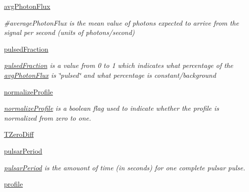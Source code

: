 \begin{DoxyCompactItemize}
\hyperlink{classmodest_1_1signals_1_1periodicxraysource_1_1PeriodicXRaySource_ab18463cedaf7e9ea17447e46f341bbb0}{avg\+Photon\+Flux}
\begin{DoxyCompactList}\small\item\em \#average\+Photon\+Flux is the mean value of photons expected to arrive from the signal per second (units of photons/second) \end{DoxyCompactList}\item 
\hyperlink{classmodest_1_1signals_1_1periodicxraysource_1_1PeriodicXRaySource_af76a5783d522dde15f37a9c48aa04391}{pulsed\+Fraction}
\begin{DoxyCompactList}\small\item\em \hyperlink{classmodest_1_1signals_1_1periodicxraysource_1_1PeriodicXRaySource_af76a5783d522dde15f37a9c48aa04391}{pulsed\+Fraction} is a value from 0 to 1 which indicates what percentage of the \hyperlink{classmodest_1_1signals_1_1periodicxraysource_1_1PeriodicXRaySource_ab18463cedaf7e9ea17447e46f341bbb0}{avg\+Photon\+Flux} is \char`\"{}pulsed\char`\"{} and what percentage is constant/background \end{DoxyCompactList}\item 
\hyperlink{classmodest_1_1signals_1_1periodicxraysource_1_1PeriodicXRaySource_a61df217b2685c2ccf9b0220044849a3c}{normalize\+Profile}
\begin{DoxyCompactList}\small\item\em \hyperlink{classmodest_1_1signals_1_1periodicxraysource_1_1PeriodicXRaySource_a61df217b2685c2ccf9b0220044849a3c}{normalize\+Profile} is a boolean flag used to indicate whether the profile is normalized from zero to one. \end{DoxyCompactList}\item 
\hyperlink{classmodest_1_1signals_1_1periodicxraysource_1_1PeriodicXRaySource_ac8781ace6f2f18d79a5114a0ce6224cc}{T\+Zero\+Diff}
\item 
\hyperlink{classmodest_1_1signals_1_1periodicxraysource_1_1PeriodicXRaySource_a85fd954a8c19067087bbcb41a43a9f75}{pulsar\+Period}
\begin{DoxyCompactList}\small\item\em \hyperlink{classmodest_1_1signals_1_1periodicxraysource_1_1PeriodicXRaySource_a85fd954a8c19067087bbcb41a43a9f75}{pulsar\+Period} is the amouont of time (in seconds) for one complete pulsar pulse. \end{DoxyCompactList}\item 
\hyperlink{classmodest_1_1signals_1_1periodicxraysource_1_1PeriodicXRaySource_a584d852c7e7be3d7a3ceb886575e9039}{profile}

\end{DoxyCompactItemize}
